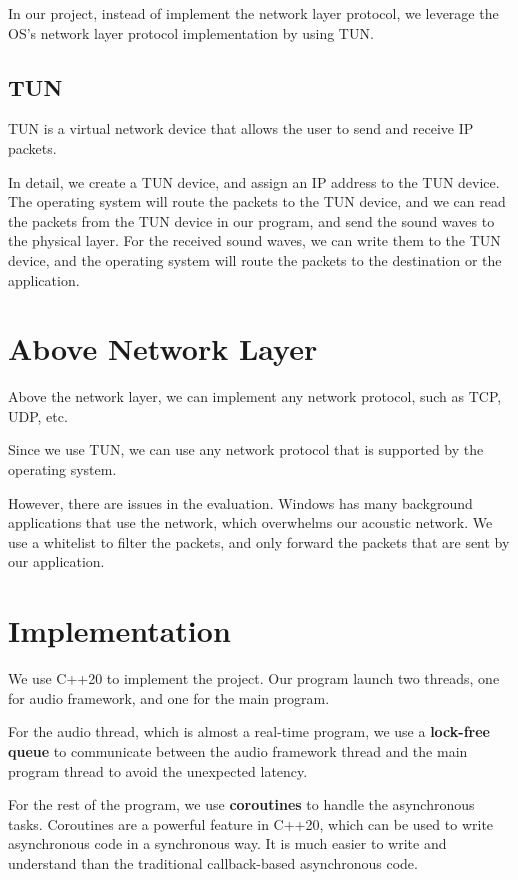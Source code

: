 \documentclass{article}
\begin{document}
In our project, instead of implement the network layer protocol, we leverage the OS's network layer protocol implementation by using TUN.

\subsection{TUN}

TUN is a virtual network device that allows the user to send and receive IP packets.

In detail, we create a TUN device, and assign an IP address to the TUN device.
The operating system will route the packets to the TUN device, and we can read the packets from the TUN device in our program, and send the sound waves to the physical layer. For the received sound waves, we can write them to the TUN device, and the operating system will route the packets to the destination or the application.

\section{Above Network Layer}

Above the network layer, we can implement any network protocol, such as TCP, UDP, etc.

Since we use TUN, we can use any network protocol that is supported by the operating system.

However, there are issues in the evaluation.
Windows has many background applications that use the network, which overwhelms our acoustic network.
We use a whitelist to filter the packets, and only forward the packets that are sent by our application.

\section{Implementation}

We use C++20 to implement the project.
Our program launch two threads, one for audio framework, and one for the main program.

For the audio thread, which is almost a real-time program, we use a \textbf{lock-free queue} to communicate between the audio framework thread and the main program thread to avoid the unexpected latency.

For the rest of the program, we use \textbf{coroutines} to handle the asynchronous tasks.
Coroutines are a powerful feature in C++20, which can be used to write asynchronous code in a synchronous way.
It is much easier to write and understand than the traditional callback-based asynchronous code.
\end{document}
